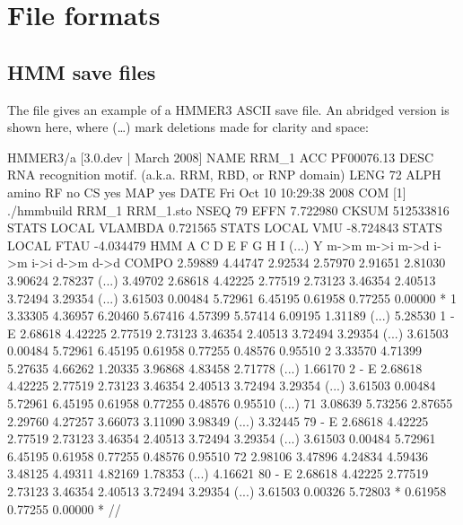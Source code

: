 \section{File formats}
\label{section:formats}


\subsection{HMM save files}
\label{section:savefiles}

The file  gives an example of a HMMER3 ASCII
save file. An abridged version is shown here, where (\ldots) mark
deletions made for clarity and space:

\begin{tinysreoutput}
HMMER3/a [3.0.dev | March 2008]
NAME  RRM_1
ACC   PF00076.13
DESC  RNA recognition motif. (a.k.a. RRM, RBD, or RNP domain)
LENG  72
ALPH  amino
RF    no
CS    yes
MAP   yes
DATE  Fri Oct 10 10:29:38 2008
COM   [1] ./hmmbuild RRM_1 RRM_1.sto
NSEQ  79
EFFN  7.722980
CKSUM 512533816
STATS LOCAL     VLAMBDA 0.721565
STATS LOCAL         VMU -8.724843
STATS LOCAL        FTAU -4.034479
HMM          A        C        D        E        F        G        H        I     (...)    Y
            m->m     m->i     m->d     i->m     i->i     d->m     d->d
  COMPO   2.59889  4.44747  2.92534  2.57970  2.91651  2.81030  3.90624  2.78237  (...) 3.49702
          2.68618  4.42225  2.77519  2.73123  3.46354  2.40513  3.72494  3.29354  (...) 3.61503
          0.00484  5.72961  6.45195  0.61958  0.77255  0.00000        *
      1   3.33305  4.36957  6.20460  5.67416  4.57399  5.57414  6.09195  1.31189  (...) 5.28530      1 - E
          2.68618  4.42225  2.77519  2.73123  3.46354  2.40513  3.72494  3.29354  (...) 3.61503
          0.00484  5.72961  6.45195  0.61958  0.77255  0.48576  0.95510
      2   3.33570  4.71399  5.27635  4.66262  1.20335  3.96868  4.83458  2.71778  (...) 1.66170      2 - E
          2.68618  4.42225  2.77519  2.73123  3.46354  2.40513  3.72494  3.29354  (...) 3.61503
          0.00484  5.72961  6.45195  0.61958  0.77255  0.48576  0.95510
(...)
     71   3.08639  5.73256  2.87655  2.29760  4.27257  3.66073  3.11090  3.98349  (...) 3.32445     79 - E
          2.68618  4.42225  2.77519  2.73123  3.46354  2.40513  3.72494  3.29354  (...) 3.61503
          0.00484  5.72961  6.45195  0.61958  0.77255  0.48576  0.95510
     72   2.98106  3.47896  4.24834  4.59436  3.48125  4.49311  4.82169  1.78353  (...) 4.16621     80 - E
          2.68618  4.42225  2.77519  2.73123  3.46354  2.40513  3.72494  3.29354  (...) 3.61503
          0.00326  5.72803        *  0.61958  0.77255  0.00000        *
//
\end{tinysreoutput}


